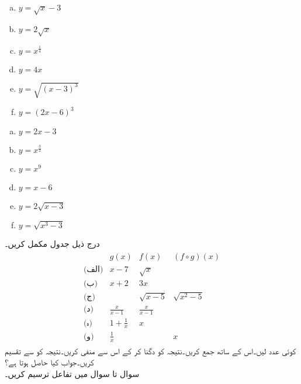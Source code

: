\begin{multicols}{4}
\begin{enumerate}[a.]
\item
$y=\sqrt{x}-3$
\item
$y=2\sqrt{x}$
\item
$y=x^{\tfrac{1}{4}}$
\item
$y=4x$
\item
$y=\sqrt{(x-3)^3}$
\item
$y=(2x-6)^3$
\end{enumerate}
\end{multicols}
\begin{multicols}{4}
\begin{enumerate}[a.]
\item
$y=2x-3$
\item
$y=x^{\tfrac{3}{2}}$
\item
$y=x^9$
\item
$y=x-6$
\item
$y=2\sqrt{x-3}$
\item
$y=\sqrt{x^3-3}$
\end{enumerate}
\end{multicols}
درج ذیل جدول مکمل کریں۔
\begin{align*}
\begin{array}{cccc}
&g(x)&f(x)&(f\circ g)(x)\\
\hline
\text{(الف)} & x-7& \sqrt{x}&\\
\text{(ب)}&x+2&3x&\\
\text{(ج)} & &\sqrt{x-5}&\sqrt{x^2-5}\\
\text{(د)} &\frac{x}{x-1}&\frac{x}{x-1}&\\
\text{(ہ)} &1+\frac{1}{x}&x\\
\text{(و)} &\frac{1}{x}&&x
\end{array}
\end{align*}
کوئی عدد  لیں۔اس کے ساتھ  جمع کریں۔نتیجہ کو دگنا کر کے اس سے  منفی کریں۔نتیجہ کو  سے تقسیم کریں۔جواب کیا حاصل ہوتا ہے؟
\\

سوال  تا سوال  میں تفاعل ترسیم کریں۔

